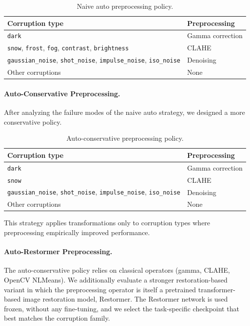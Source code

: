 \documentclass[10pt]{article}
\begin{document}
\begin{table}[H]
\centering
\begin{tabular}{ll}
\toprule
Corruption type & Preprocessing \\
\midrule
\texttt{dark} & Gamma correction \\
\texttt{snow}, \texttt{frost}, \texttt{fog}, \texttt{contrast}, \texttt{brightness} & CLAHE \\
\texttt{gaussian\_noise}, \texttt{shot\_noise}, \texttt{impulse\_noise}, \texttt{iso\_noise} & Denoising \\
Other corruptions & None \\
\bottomrule
\end{tabular}
\caption{Naive auto preprocessing policy.}
\label{tab:naive-auto-policy}
\end{table}

\paragraph{Auto-Conservative Preprocessing.}
After analyzing the failure modes of the naive auto strategy, we designed a more conservative policy.

\begin{table}[H]
\centering
\begin{tabular}{ll}
\toprule
Corruption type & Preprocessing \\
\midrule
\texttt{dark} & Gamma correction \\
\texttt{snow} & CLAHE \\
\texttt{gaussian\_noise}, \texttt{shot\_noise}, \texttt{impulse\_noise}, \texttt{iso\_noise} & Denoising \\
Other corruptions & None \\
\bottomrule
\end{tabular}
\caption{Auto-conservative preprocessing policy.}
\label{tab:auto-conservative-policy}
\end{table}

This strategy applies transformations only to corruption types where preprocessing empirically improved performance.

\paragraph{Auto-Restormer Preprocessing.}
The auto-conservative policy relies on classical operators (gamma, CLAHE, OpenCV NLMeans). We additionally evaluate a stronger restoration-based variant in which the preprocessing operator is itself a pretrained transformer-based image restoration model, Restormer. The Restormer network is used frozen, without any fine-tuning, and we select the task-specific checkpoint that best matches the corruption family.
\end{document}
